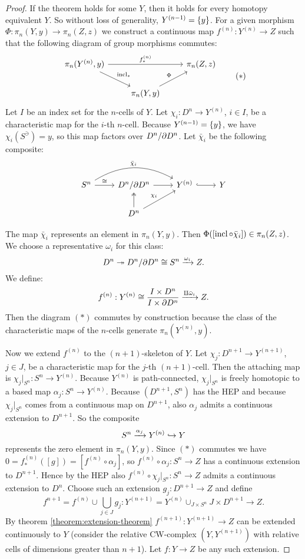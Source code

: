 \begin{proof}
If the theorem holds for some $Y$, then it holds for every homotopy equivalent $Y$. So without loss of generality, $Y^{({n-1})}=\{y\}$. For a given morphism $\Phi:\pi_n(Y,y)\to\pi_n(Z,z)$ we construct a continuous map $f^{(n)}:Y^{(n)}\to Z$ such that the following diagram of group morphisms commutes:
\[\begin{tikzcd}
\pi_n(Y^{(n)},y) \ar[dr,"\incl_*"] \ar[rr,"f^{(n)}_*"] & & \pi_n(Z,z) \\
& \pi_n(Y,y) \ar[ur,"\Phi"] &
\end{tikzcd}
\tag{$*$}\]
Let $I$ be an index set for the $n$-cells of $Y$. Let $\chi_i:D^n\to Y^{(n)}$, $i\in I$, be a characteristic map for the $i$-th $n$-cell. Because $Y^{({n-1})}=\{y\}$, we have $\chi_i(S^\ni)=y$, so this map factors over $D^n/\partial D^n$. Let $\bar\chi_i$ be the following composite:
\[\begin{tikzcd}
S^n \ar[r,"\cong"] \ar[rr,bend left,"\bar\chi_i"] & D^n/\de D^n \ar[r] & Y^{(n)} \ar[r,hook] & Y \\
& D^n \ar[u,two heads] \ar[ur,"\chi_i"] & & 
\end{tikzcd}\]

The map $\bar\chi_i$ represents an element in $\pi_n(Y,y)$. Then $\Phi([\operatorname{incl}\circ\bar\chi_i])\in\pi_n(Z,z)$. We choose a representative $\omega_i$ for this class:
\[D^n\twoheadrightarrow D^n/\partial D^n\cong S^n\xrightarrow{\omega_i}Z.\]
We define:
\[f^{(n)}:Y^{(n)}\cong\frac{I\times D^n}{I\times\partial D^n}\xrightarrow{\amalg\bar\omega_i}Z.\]
Then the diagram $(*)$ commutes by construction because the class of the characteristic maps of the $n$-cells generate $\pi_n(Y^{(n)},y)$.

Now we extend $f^{(n)}$ to the $(n+1)$-skeleton of $Y$. Let $\chi_j:D^{n+1}\to Y^{(n+1)}$, $j\in J$, be a characteristic map for the $j$-th $(n+1)$-cell. Then the attaching map is $\chi_j|_{S^n}:S^n\to Y^{(n)}$. Because $Y^{(n)}$ is path-connected, $\chi_j|_{S^n}$ is freely homotopic to a based map $\alpha_j:S^n\to Y^{(n)}$. Because $(D^{n+1},S^n)$ has the HEP and because $\chi_j|_{S^n}$ comes from a continuous map on $D^{n+1}$, also $\alpha_j$ admits a continuous extension to $D^{n+1}$. So the composite
\[S^n\xrightarrow{\alpha_j}Y^{(n)}\hookrightarrow Y\]
represents the zero element in $\pi_n(Y,y)$. Since $(*)$ commutes we have $0=f^{(n)}_*([g])=[f^{(n)}\circ\alpha_j]$, so $f^{(n)}\circ\alpha_j:S^n\to Z$ has a continuous extension to $D^{n+1}$. Hence by the HEP also $f^{(n)}\circ\chi_j|_{S^n}:S^n\to Z$ admits a continuous extension to $D^n$. Choose such an extension $g_j:D^{n+1}\to Z$ and define
\[f^{n+1}=f^{(n)}\cup\bigcup_{j\in J}g_j:Y^{(n+1)}=Y^{(n)}\cup_{J\times S^n}J\times D^{n+1}\to Z.\]
By theorem \ref{theorem:extension-theorem} $f^{(n+1)}:Y^{(n+1)}\to Z$ can be extended continuously to $Y$ (consider the relative CW-complex $(Y,Y^{(n+1)})$ with relative cells of dimensions greater than $n+1$). Let $f:Y\to Z$ be any such extension.


\end{proof}
